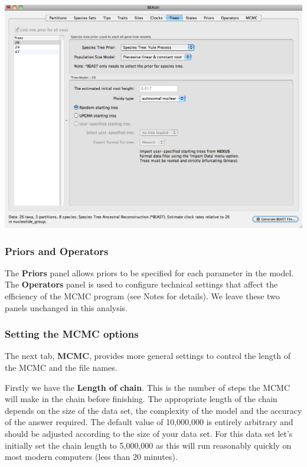 \documentclass[12pt]{article}
\begin{document}
\medskip{}

\includegraphics[scale=0.4]{figures/BEAUti_Tree}

\medskip{}

\subsubsection*{Priors and Operators}

The {\bf Priors} panel allows priors to be specified for each parameter in the model. The {\bf Operators} panel is used to configure technical settings that affect the efficiency of the MCMC program (see Notes for details). We leave these two panels unchanged in this analysis.

\subsubsection*{Setting the MCMC options }

The next tab, {\bf MCMC}, provides more general
settings to control the length of the MCMC and the file names. 

Firstly we have the \textbf{Length of chain}. This is the number of
steps the MCMC will make in the chain before finishing. The appropriate length of the chain depends on the size of the data set, the complexity of the
model and the accuracy of the answer required. The default value of 10,000,000
is entirely arbitrary and should be adjusted according to the size
of your data set. For this data set let's initially set the chain
length to 5,000,000 as this will run reasonably quickly on most modern
computers (less than 20 minutes).
\end{document}
